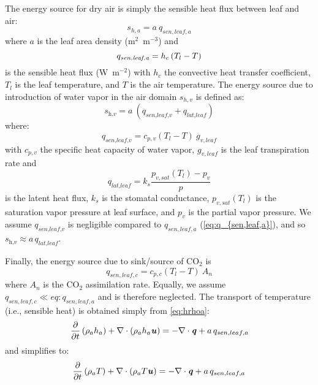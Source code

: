 The energy source for dry air is simply the sensible heat flux between leaf and air:
\begin{equation}
s_{h,a} = a~ q_{sen,leaf,a}
\end{equation}
where $a$ is the leaf area density (m$^{2}$~m$^{-3}$) and
\begin{equation}
q_{\textit{sen,leaf,a}} = h_c \left(T_l - T\right)
\label{eq:q_{sen,leaf,a}}
\end{equation}
is the sensible heat flux (W~m$^{-2}$) with $h_c$ the convective heat transfer coefficient, $T_l$ is the leaf temperature, and $T$ is the air temperature. The energy source due to introduction of water vapor in the air domain $s_{h,v}$ is defined as:
\begin{equation}
s_{\textit{h,v}} = a ~ \left( q_{\textit{sen,leaf,v}}  + q_{\textit{lat,leaf}} \right)
\end{equation}
where:
\begin{equation}
q_{\textit{sen,leaf,v}} = c_{p,v} \left(T_l - T\right) ~ g_{v,leaf}
\end{equation}
with $c_{p,v}$ the specific heat capacity of water vapor, $g_{v,leaf}$ is the leaf transpiration rate and
\begin{equation}
q_{l\textit{at,leaf}} = k_s \frac{p_{v,sat}(T_l) - p_v}{p}
\end{equation}
is the latent heat flux, $k_s$ is the stomatal conductance, $p_{v,sat}(T_l)$ is the saturation vapor pressure at leaf surface, and $p_v$ is the partial vapor pressure. We assume $q_{\textit{sen,leaf,v}}$ is negligible compared to $q_{sen,leaf,a}$ (\cref{eq:q_{sen,leaf,a}}), and so $s_{\textit{h,v}} \approx a\,q_{\textit{lat,leaf}}$. 

Finally, the energy source due to sink/source of CO$_2$ is 
\begin{equation}
q_{sen,leaf,c} = c_{p,c} \left(T_l - T\right)~A_n
\end{equation}
where $A_n$ is the CO$_2$ assimilation rate. Equally, we assume $q_{sen,leaf,c} \ll eq:q_{sen,leaf,a}$ and is therefore neglected. The transport of temperature (i.e., sensible heat) is obtained simply from \cref{eq:hrhoa}:
\begin{equation}
	\frac{\partial }{\partial t} \left( \rho_a h_a \right) +   \nabla  \cdot \left( \rho_a h_a \textbf{\textit{u}}\right) =  - \nabla  \cdot \textbf{\textit{q}} + a\,q_{sen,leaf,a}\\
\end{equation}
and simplifies to:
\begin{equation}
\frac{\partial }{\partial t} \left( \rho_a T \right) +   \nabla  \cdot \left( \rho_a T \textbf{\textit{u}}\right) =  - \nabla  \cdot \textbf{\textit{q}} + a\,q_{sen,leaf,a}\\
\end{equation}

